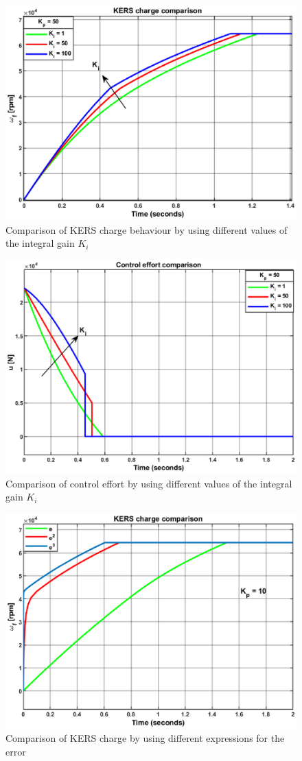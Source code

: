 \documentclass[11pt]{article}
\begin{document}
\begin{figure}[H]
\centering
\includegraphics[width=.6\textwidth]{Images/Results_Dynamics/Charge_comparison/kers_charge_comp_IntGain.eps}
\caption{Comparison of KERS charge behaviour by using different values of the integral gain $K_i$}
\label{fig: Comparison_KERS_Charge_PI}
\end{figure}

\begin{figure}[H]
\centering
\includegraphics[width=.6\textwidth]{Images/Results_Dynamics/Charge_comparison/control_effort_charge_comp_IntGain.eps}
\caption{Comparison of control effort by using different values of the integral gain $K_i$}
\label{fig: Comparison_Control_Effort_PI}
\end{figure}

\begin{figure}[H]
\centering
\includegraphics[width=.6\textwidth]{Images/Results_Dynamics/Charge_comparison/kers_charge_comp_controller.eps}
\caption{Comparison of KERS charge by using different expressions for the error}
\label{fig: Comparison_KERS_charge_error}
\end{figure}

\end{document}
